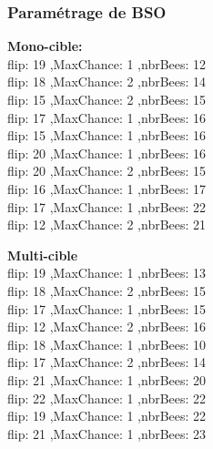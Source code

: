 \subsubsection{Paramétrage de BSO}
\noindent
\begin{minipage}[t]{0.55\textwidth}
	\textbf{Mono-cible:} \\
	 flip: 19 ,MaxChance: 1 ,nbrBees: 12\\
	 flip: 18 ,MaxChance: 2 ,nbrBees: 14\\
	 flip: 15 ,MaxChance: 2 ,nbrBees: 15\\
	 flip: 17 ,MaxChance: 1 ,nbrBees: 16\\
	 flip: 15 ,MaxChance: 1 ,nbrBees: 16\\
	 flip: 20 ,MaxChance: 1 ,nbrBees: 16\\
	 flip: 20 ,MaxChance: 2 ,nbrBees: 15\\
	 flip: 16 ,MaxChance: 1 ,nbrBees: 17\\
	 flip: 17 ,MaxChance: 1 ,nbrBees: 22\\
	 flip: 12 ,MaxChance: 2 ,nbrBees: 21\\

	
\end{minipage}\hfill
\hspace{0.2cm}
\begin{minipage}[t]{0.55\textwidth}
	\textbf{Multi-cible}\\
	 flip: 19 ,MaxChance: 1 ,nbrBees: 13\\
	 flip: 18 ,MaxChance: 2 ,nbrBees: 15\\
	 flip: 17 ,MaxChance: 1 ,nbrBees: 15\\
	 flip: 12 ,MaxChance: 2 ,nbrBees: 16\\
	 flip: 18 ,MaxChance: 1 ,nbrBees: 10\\
	 flip: 17 ,MaxChance: 2 ,nbrBees: 14\\
	 flip: 21 ,MaxChance: 1 ,nbrBees: 20\\
	 flip: 22 ,MaxChance: 1 ,nbrBees: 22\\
	 flip: 19 ,MaxChance: 1 ,nbrBees: 22\\
	 flip: 21 ,MaxChance: 1 ,nbrBees: 23\\

\end{minipage}\hfill



